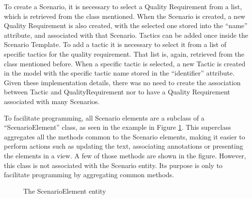 To create a Scenario, it is necessary to select a Quality Requirement from a list, which is retrieved from the class mentioned. When the Scenario is created, a new Quality Requirement is also created, with the selected one stored into the ``name'' attribute, and associated with that Scenario. Tactics can be added once inside the Scenario Template. To add a tactic it is necessary to select it from a list of specific tactics for the quality requirement. That list is, again, retrieved from the class mentioned before. When a specific tactic is selected, a new Tactic is created in the model with the specific tactic name stored in the ``identifier'' attribute. Given these implementation details, there was no need to create the association between Tactic and QualityRequirement nor to have a Quality Requirement associated with many Scenarios.

To facilitate programming, all Scenario elements are a subclass of a ``ScenarioElement'' class, as seen in the example in Figure \ref{figure:modelScenarioElement}. This superclass aggregates all the methods common to the Scenario elements, making it easier to perform actions such as updating the text, associating annotations or presenting the elements in a view. A few of those methods are shown in the figure. However, this class is not associated with the Scenario entity. Its purpose is only to facilitate programming by aggregating common methods. 

\begin{figure}[h]
\centering
\renewcommand {\umltextcolor}{black}
\renewcommand {\umlfillcolor}{none}
\renewcommand {\umldrawcolor}{black}

\caption{The ScenarioElement entity}
\label{figure:modelScenarioElement}
\end{figure}

